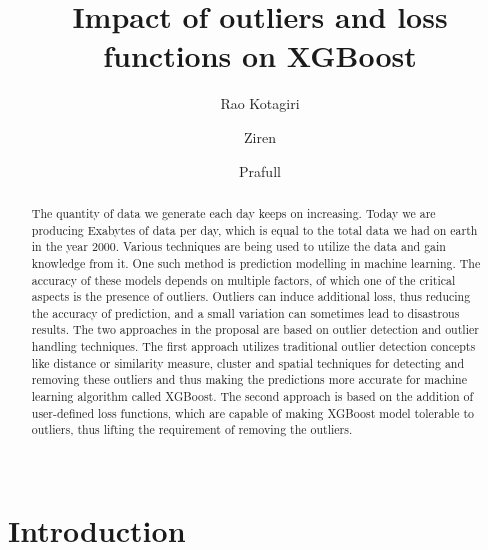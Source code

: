\documentclass[runningheads]{llncs}
\begin{document}
%
\title{Impact of outliers and loss functions on XGBoost}

%
%
\author{Rao Kotagiri \and
Ziren \and
Prafull}
%
%
%
\maketitle              %
%
\begin{abstract}
\paragraph{} The quantity of data we generate each day keeps on increasing. Today we are producing Exabytes of data per day, which is equal to the total data we had on earth in the year 2000. Various techniques are being used to utilize the data and gain knowledge from it. One such method is prediction modelling in machine learning. The accuracy of these models depends on multiple factors, of which one of the critical aspects is the presence of outliers. Outliers can induce additional loss, thus reducing the accuracy of prediction, and a small variation can sometimes lead to disastrous results. The two approaches in the proposal are based on outlier detection and outlier handling techniques. The first approach utilizes traditional outlier detection concepts like distance or similarity measure, cluster and spatial techniques for detecting and removing these outliers and thus making the predictions more accurate for machine learning algorithm called XGBoost. The second approach is based on the addition of user-defined loss functions, which are capable of making XGBoost model tolerable to outliers, thus lifting the requirement of removing the outliers. \\
\\


\end{abstract}
%
%
%
\section{Introduction}
\end{document}
